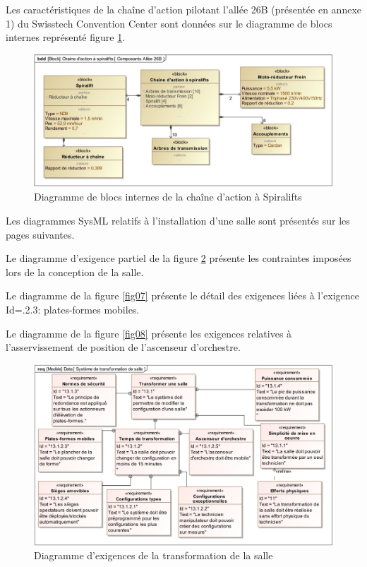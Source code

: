 Les caractéristiques de la chaîne d'action pilotant l'allée 26B (présentée en annexe 1) du Swisstech Convention Center sont données sur le diagramme de blocs internes représenté figure \ref{fig05}.

\begin{figure}[!h]
 \centering\includegraphics[width=0.7\linewidth]{img/fig05}
 \caption{Diagramme de blocs internes de la chaîne d'action à Spiralifts}
 \label{fig05}
\end{figure}

Les diagrammes SysML relatifs à l'installation d'une salle sont présentés sur les pages suivantes.

Le diagramme d'exigence partiel de la figure \ref{fig06} présente les contraintes imposées lors de la conception de la salle.

Le diagramme de la figure \ref{fig07} présente le détail des exigences liées à l'exigence Id=.2.3: plates-formes mobiles\fg.

Le diagramme de la figure \ref{fig08} présente les exigences relatives à l'asservissement de position de l'ascenseur d'orchestre.

\begin{figure}[!h]
 \centering\includegraphics[width=0.7\linewidth]{img/fig06}
 \caption{Diagramme d'exigences de la transformation de la salle}
 \label{fig06}
\end{figure}

